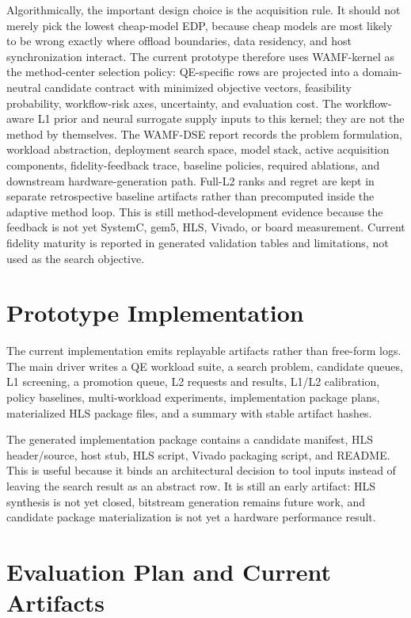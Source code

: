 \documentclass[sigconf,anonymous,review]{acmart}
\begin{document}
Algorithmically, the important design choice is the acquisition rule.  It should not merely pick the lowest cheap-model EDP, because cheap models are most likely to be wrong exactly where offload boundaries, data residency, and host synchronization interact.  The current prototype therefore uses WAMF-kernel as the method-center selection policy: QE-specific rows are projected into a domain-neutral candidate contract with minimized objective vectors, feasibility probability, workflow-risk axes, uncertainty, and evaluation cost.  The workflow-aware L1 prior and neural surrogate supply inputs to this kernel; they are not the method by themselves.  The WAMF-DSE report records the problem formulation, workload abstraction, deployment search space, model stack, active acquisition components, fidelity-feedback trace, baseline policies, required ablations, and downstream hardware-generation path.  Full-L2 ranks and regret are kept in separate retrospective baseline artifacts rather than precomputed inside the adaptive method loop.  This is still method-development evidence because the feedback is not yet SystemC, gem5, HLS, Vivado, or board measurement.
Current fidelity maturity is reported in generated validation tables and limitations, not used as the search objective.

\section{Prototype Implementation}

The current implementation emits replayable artifacts rather than free-form logs.  The main driver writes a QE workload suite, a search problem, candidate queues, L1 screening, a promotion queue, L2 requests and results, L1/L2 calibration, policy baselines, multi-workload experiments, implementation package plans, materialized HLS package files, and a summary with stable artifact hashes.

The generated implementation package contains a candidate manifest, HLS header/source, host stub, HLS script, Vivado packaging script, and README.  This is useful because it binds an architectural decision to tool inputs instead of leaving the search result as an abstract row.  It is still an early artifact: HLS synthesis is not yet closed, bitstream generation remains future work, and candidate package materialization is not yet a hardware performance result.

\section{Evaluation Plan and Current Artifacts}
\end{document}
